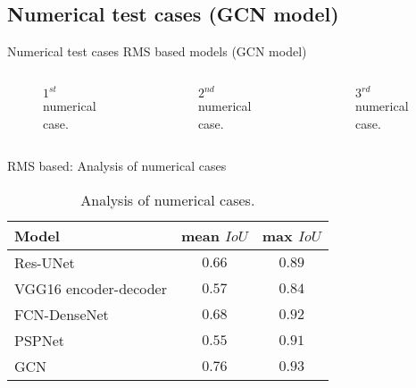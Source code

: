 \documentclass[10pt,aspectratio=169,dvipsnames]{beamer} %
\begin{document}
		\subsection{Numerical test cases (GCN model)}
		\begin{frame}{Numerical test cases RMS based models (GCN model)}
			\begin{columns}[T]
				\begin{column}[c]{0.32\textwidth}
					\begin{figure}[c]
						\centering
						\caption{\(1^{st}\) numerical case.}
					\end{figure}
				\end{column}
				\hfill
				\begin{column}[c]{0.32\textwidth}
					\begin{figure}[c]
						\centering
						\caption{\(2^{nd}\) numerical case.}
					\end{figure}
				\end{column}
				\hfill
				\begin{column}[c]{0.32\textwidth}
					\begin{figure}[c]
						\centering
						\caption{\(3^{rd}\) numerical case.}
					\end{figure}
				\end{column}
			\end{columns}
		\end{frame}
		
		\begin{frame}{RMS based: Analysis of numerical cases}
			\begin{table}[ht!]
				\centering
				\caption{Analysis of numerical cases.}
				\label{tab:table_all_numerical_cases}	
				\begin{tabular}{lcc}
					\toprule
					Model & mean \(IoU\) & max \(IoU\) \\ 
					\midrule 
					Res-UNet & \(0.66\) & \(0.89\) \\ 
					VGG16 encoder-decoder & \(0.57\) & \(0.84\) \\ 
					FCN-DenseNet & \(0.68\) & \(0.92\) \\ 
					PSPNet & \(0.55\) & \(0.91\) \\ 
					GCN & \(0.76\) & \(0.93\) \\ 
					\bottomrule
				\end{tabular}
			\end{table}
		\end{frame}
		
\end{document}
